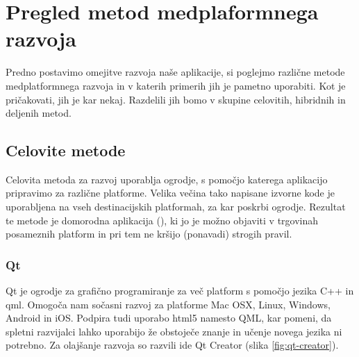 

\chapter{Pregled metod medplaformnega razvoja}
\label{chap:overview}

Predno postavimo omejitve razvoja naše aplikacije, si poglejmo različne metode medplatformnega razvoja in v katerih primerih jih je pametno uporabiti. Kot je pričakovati, jih je kar nekaj. Razdelili jih bomo v skupine celovitih, hibridnih in deljenih metod.

\section{Celovite metode}

Celovita metoda za razvoj uporablja ogrodje, s pomočjo katerega aplikacijo pripravimo za različne platforme. Velika večina tako napisane izvorne kode je uporabljena na vseh destinacijskih platformah, za kar poskrbi ogrodje. Rezultat te metode je domorodna aplikacija (), ki jo je možno objaviti v trgovinah posameznih platform in pri tem ne kršijo (ponavadi) strogih pravil.

\subsection{Qt}

Qt\cite{qt} je ogrodje za grafično programiranje za več platform s pomočjo jezika C++ in \gls{qml}. Omogoča nam sočasni razvoj za platforme Mac OSX, Linux, Windows, Android in iOS. Podpira tudi uporabo \gls{html5} namesto QML, kar pomeni, da spletni razvijalci lahko uporabijo že obstoječe znanje in učenje novega jezika ni potrebno. Za olajšanje razvoja so razvili \gls{ide} Qt Creator (slika \ref{fig:qt-creator}).

